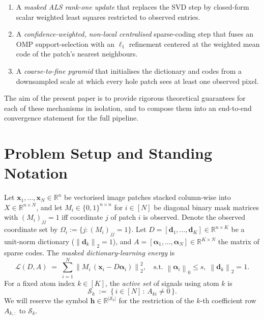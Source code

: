 \documentclass[journal,onecolumn,11pt]{IEEEtran}
\theoremstyle{definition}
\newcommand{\R}{\mathbb{R}}
\newcommand{\Loss}{\mathcal{L}}
\newcommand{\norm}[1]{\left\lVert #1 \right\rVert}
\newcommand{\Sk}{\mathcal{S}_k}
\newcommand{\Om}{\Omega}
\newcommand{\dvec}{\bm{d}}
\newcommand{\hvec}{\bm{h}}
\newcommand{\xvec}{\bm{x}}
\newcommand{\alphavec}{\bm{\alpha}}
\begin{document}
\begin{enumerate}
\item A \emph{masked ALS rank-one update} that replaces the SVD step by
  closed-form scalar weighted least squares restricted to observed entries.
\item A \emph{confidence-weighted, non-local centralised} sparse-coding
  step that fuses an OMP support-selection with an $\ell_1$ refinement
  centered at the weighted mean code of the patch's nearest neighbours.
\item A \emph{coarse-to-fine pyramid} that initialises the dictionary and
  codes from a downsampled scale at which every hole patch sees at least
  one observed pixel.
\end{enumerate}

The aim of the present paper is to provide rigorous theoretical guarantees
for each of these mechanisms in isolation, and to compose them into an
end-to-end convergence statement for the full pipeline.

\section{Problem Setup and Standing Notation}
\label{sec:setup}

Let $\xvec_1,\dots,\xvec_N \in \R^n$ be vectorised image patches stacked
column-wise into $X\in\R^{n\times N}$, and let
$M_i\in\{0,1\}^{n\times n}$ for $i\in[N]$ be diagonal binary mask
matrices with $(M_i)_{jj}=1$ iff coordinate $j$ of patch $i$ is observed.
Denote the observed coordinate set by $\Om_i := \{j:(M_i)_{jj}=1\}$. Let
$D=[\dvec_1,\dots,\dvec_K]\in\R^{n\times K}$ be a unit-norm dictionary
($\norm{\dvec_k}_2=1$), and $A=[\alphavec_1,\dots,\alphavec_N]\in\R^{K\times N}$
the matrix of sparse codes. The \emph{masked dictionary-learning energy}
is
\begin{equation}
\boxed{\;
\Loss(D,A) \;=\; \sum_{i=1}^{N} \norm{M_i\,(\xvec_i - D\alphavec_i)}_2^2,
\quad \text{s.t. } \norm{\alphavec_i}_0 \le s,\;\norm{\dvec_k}_2=1.
\;}
\label{eq:masked-loss}
\end{equation}
For a fixed atom index $k\in[K]$, the \emph{active set} of signals using
atom $k$ is
\begin{equation}
\Sk \;:=\; \{\,i\in[N]\,:\, A_{ki}\neq 0\,\}.
\end{equation}
We will reserve the symbol $\hvec\in\R^{|\Sk|}$ for the restriction of the
$k$-th coefficient row $A_{k,:}$ to $\Sk$.
\end{document}
